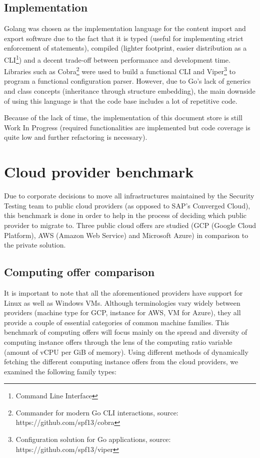 \documentclass[11pt]{article}
\begin{document}
\subsection{Implementation}

Golang was chosen as the implementation language for the content import and export software due to the fact that it is typed (useful for implementing strict enforcement of statements), compiled (lighter footprint, easier distribution as a CLI\footnote{Command Line Interface}) and a decent trade-off between performance and development time. Libraries such as Cobra\footnote{Commander for modern Go CLI interactions, source: https://github.com/spf13/cobra} were used to build a functional CLI and Viper\footnote{Configuration solution for Go applications, source: https://github.com/spf13/viper} to program a functional configuration parser. However, due to Go's lack of generics and class concepts (inheritance through structure embedding), the main downside of using this language is that the code base includes a lot of repetitive code.

Because of the lack of time, the implementation of this document store is still Work In Progress (required functionalities are implemented but code coverage is quite low and further refactoring is necessary). 


\pagebreak
\section{Cloud provider benchmark}

\hspace{5mm} Due to corporate decisions to move all infrastructures maintained by the Security Testing team to public cloud providers (as opposed to SAP's Converged Cloud), this benchmark is done in order to help in the process of deciding which public provider to migrate to. Three public cloud offers are studied (GCP (Google Cloud Platform), AWS (Amazon Web Service) and Microsoft Azure) in comparison to the private solution. 

\subsection{Computing offer comparison}

\hspace{5mm} It is important to note that all the aforementioned providers have support for Linux as well as Windows VMs. Although terminologies vary widely between providers (machine type for GCP, instance for AWS, VM for Azure), they all provide a couple of essential categories of common machine families. This benchmark of computing offers will focus mainly on the spread and diversity of computing instance offers through the lens of the computing ratio variable (amount of vCPU per GiB of memory). Using different methods of dynamically fetching the different computing instance offers from the cloud providers, we examined the following family types:
\end{document}
